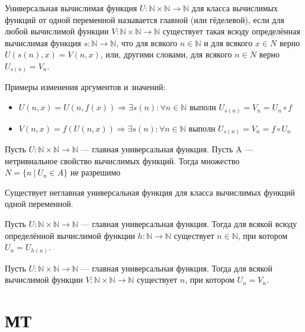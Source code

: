 \documentclass{article}
\newcommand{\then}{\Rightarrow}
\newcommand{\N}{\mathbb{N}}
\newenvironment{theorem}[2][Т]{\begin{trivlist}
\item[\hskip \labelsep {\bfseries #1}\hskip \labelsep {\bfseries #2.}]}{\end{trivlist}}
\newenvironment{definition}[2][О]{\begin{trivlist}
\item[\hskip \labelsep {\bfseries #1}\hskip \labelsep {\bfseries #2}]}{\end{trivlist}}
\begin{document}
\begin{definition}{УВФ}
Универсальная вычислимая функция $U : \N \times \N \to \N$ для класса вычислимых функций от одной переменной называется главной (или гёделевой),
если для любой вычислимой функции $V : \N \times \N \to \N$ существует такая всюду определённая вычислимая функция $s: \N \to \N$, что для всякого $n \in \N$ и для всякого
$x \in N$ верно $U(s(n), x) = V (n, x)$, или, другими словами, для всякого $n \in N$ верно
$U_{s(n)} = V_n$.

Примеры изменения аргументов и значений:
\begin{itemize}
\item $U(n, x) = U(n, f(x)) \then \exists s(n) : \forall n \in \N \text{ выполн } U_{s(n)} = V_n = U_n \circ f$
\item $V(n, x) = f(U(n, x)) \then \exists s(n) : \forall n \in \N \text{ выполн } U_{s(n)} = V_n = f \circ U_n$
\end{itemize}
\end{definition}

\begin{theorem}{Райса – Успенского}
Пусть $U : \N \times \N \to \N$ — главная универсальная функция. Пусть A — нетривиальное свойство вычислимых функций.
Тогда множество
$
N = \{n~|~ U_n \in A\}
$
не разрешимо
\end{theorem}

\begin{theorem}{Неглавная УФ}
Существует неглавная универсальная функция для класса вычислимых функций одной переменной.
\end{theorem}


\begin{theorem}{Неподвижная точка}
Пусть $U : \N \times \N \to \N$ — главная универсальная функция. Тогда для
всякой всюду определённой вычислимой функции $h: \N \to \N$ существует $n \in \N$, при
котором $U_n = U_{h(n)}$.
\end{theorem}

\begin{definition}{Следствие из неп точки.}
Пусть $U : \N\times\N \to \N$ — главная универсальная функция. Тогда для
всякой вычислимой функции $V : \N \times \N \to \N$ существует $n$, при котором $U_n = V_n$.
\end{definition}

\section{МТ}
\end{document}
